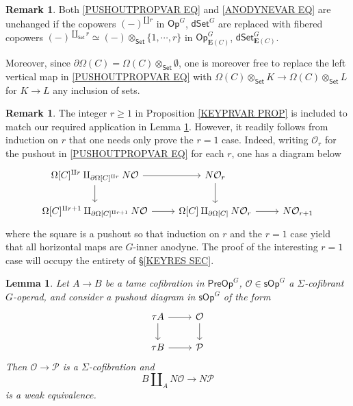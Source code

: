 \documentclass[a4paper,10pt
,draft
]{article}%
\numberwithin{equation}{section}
\numberwithin{figure}{section}
\newtheorem{lemma}[equation]{Lemma}%
\theoremstyle{definition} %
\newtheorem{remark}[equation]{Remark}%
\renewcommand{\O}{\ensuremath{\mathcal O}}
\newcommand{\1}{\ensuremath{\mathbbm 1}}%
\begin{document}
\begin{remark}\label{KEYPRVAR REM}
	Both \eqref{PUSHOUTPROPVAR EQ} and \eqref{ANODYNEVAR EQ}
	are unchanged if the copowers $(-)^{\amalg r}$ in 
	$\mathsf{Op}^G$, $\mathsf{dSet}^G$
	are replaced with fibered copowers 
	$(-)^{\amalg_{\mathsf{Set}} r} \simeq 
	(-) \otimes_{\mathsf{Set}} \{1,\cdots,r\}$
	in 
	$\mathsf{Op}^G_{\boldsymbol{E}(C)}$,
	$\mathsf{dSet}^G_{\boldsymbol{E}(C)}$.
	
	Moreover, since 
	$\partial \Omega(C) = \Omega(C) \otimes_{\mathsf{Set}} \emptyset$,
	one is moreover free to replace
	the left vertical map in \eqref{PUSHOUTPROPVAR EQ}
	with 
	$\Omega(C) \otimes_{\mathsf{Set}} K
	\to
	\Omega(C) \otimes_{\mathsf{Set}} L$
	for $K\to L$ any inclusion of sets.
\end{remark}


\begin{remark}
	The integer $r \geq 1$ in 
	Proposition \ref{KEYPRVAR PROP}
	is included to match our required application in Lemma \ref{UNITEQUIV LEM}.
	However, it readily follows from induction on $r$ that one needs only prove the $r=1$ case.
	Indeed, writing $\O_r$ for the pushout in 
	\eqref{PUSHOUTPROPVAR EQ}
	for each $r$,
	one has a diagram below
\begin{equation}
\begin{tikzcd}
	\Omega[C]^{\amalg r} \amalg_{\partial \Omega[C]^{\amalg r}} N\mathcal{O} \ar{r} \ar{d}
&
	N \mathcal{O}_r \ar{d}
\\
	\Omega[C]^{\amalg r+1} \amalg_{ \partial \Omega[C]^{\amalg r+1}} N \mathcal{O} \ar{r}
&
	\Omega[C] \amalg_{\partial \Omega[C]} N \mathcal{O}_r \ar{r}
&
	N \mathcal{O}_{r+1}
\end{tikzcd}
\end{equation}
	where the square is a pushout so that induction on $r$ and the $r=1$ case yield that all horizontal maps
	are $G$-inner anodyne.
	The proof of the interesting $r=1$ case will occupy the entirety of \S \ref{KEYRES SEC}.
\end{remark}





\begin{lemma}\label{UNITEQUIV LEM}
	Let $A \to B$ be a tame cofibration in $\mathsf{PreOp}^G$, 
	$\mathcal{O} \in \mathsf{sOp}^G$ a $\Sigma$-cofibrant 
	$G$-operad,
	and consider a pushout diagram in $\mathsf{sOp}^G$ of the form
\begin{equation}\label{THEPUSH EQ}
\begin{tikzcd}
	\tau A \ar{r} \ar{d} & \mathcal{O} \ar{d}
\\
	\tau B \ar{r} & \mathcal{P}
\end{tikzcd}
\end{equation}
	Then $\mathcal{O} \to \mathcal{P}$ is a $\Sigma$-cofibration and 
	\begin{equation}\label{UNITEQUIV EQ}
	B \amalg_{A} N \mathcal{O}
	\to 
	N \mathcal{P}
	\end{equation}
	is a weak equivalence.
\end{lemma}
\end{document}
